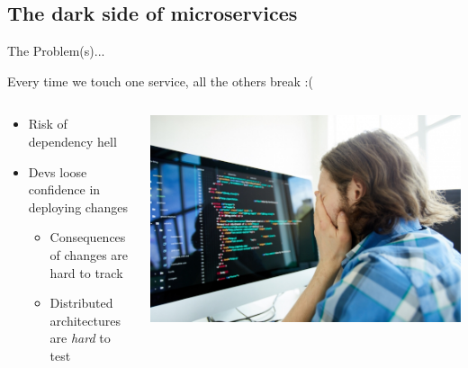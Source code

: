 \subsection{The dark side of microservices}
\begin{frame}{The Problem(s)...}
  \begin{shadequote}
    \hspace{1cm} Every time we touch one service, all the others break :(
  \end{shadequote}
  \begin{columns}
    \begin{column}{0.6\textwidth}
      \begin{itemize}
        \item Risk of dependency hell
        \item Devs loose confidence in deploying changes
        \begin{itemize}
          \item Consequences of changes are hard to track
          \item Distributed architectures are \textit{hard} to test
        \end{itemize}
      \end{itemize}
    \end{column}
    \begin{column}{0.4\textwidth}
      \includegraphics[scale=.3]{./assets/sad_dev}
    \end{column}
  \end{columns}
  \end{frame}

